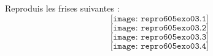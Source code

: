 \par Reproduis les frises suivantes :
\[\texttt{[image: repro605exo03.1]}\]
\[\texttt{[image: repro605exo03.2]}\]
\[\texttt{[image: repro605exo03.3]}\]
\[\texttt{[image: repro605exo03.4]}\]